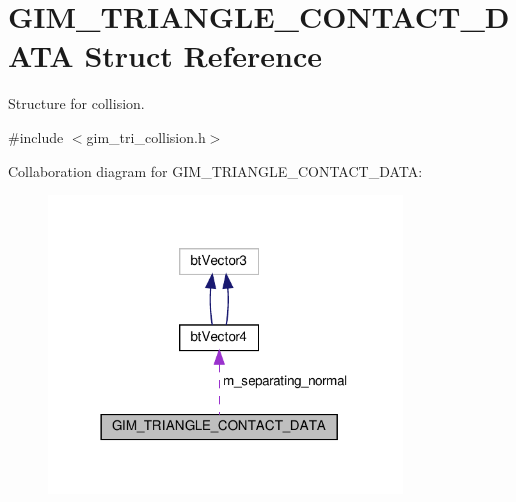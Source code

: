 \hypertarget{structGIM__TRIANGLE__CONTACT__DATA}{}\section{G\+I\+M\+\_\+\+T\+R\+I\+A\+N\+G\+L\+E\+\_\+\+C\+O\+N\+T\+A\+C\+T\+\_\+\+D\+A\+TA Struct Reference}
\label{structGIM__TRIANGLE__CONTACT__DATA}


Structure for collision.  




{\ttfamily \#include $<$gim\+\_\+tri\+\_\+collision.\+h$>$}



Collaboration diagram for G\+I\+M\+\_\+\+T\+R\+I\+A\+N\+G\+L\+E\+\_\+\+C\+O\+N\+T\+A\+C\+T\+\_\+\+D\+A\+TA\+:
\nopagebreak
\begin{figure}[H]
\begin{center}
\leavevmode
\includegraphics[width=266pt]{structGIM__TRIANGLE__CONTACT__DATA__coll__graph}
\end{center}
\end{figure}
